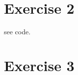 \documentclass[%
   10pt,              %
   a4paper,           %
   DIV10,             %
]{scrartcl}%
\begin{document}
\section*{Exercise 2}
see code. 
\section*{Exercise 3}
\end{document}
